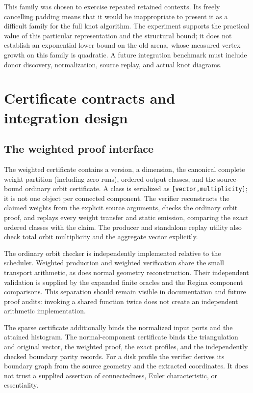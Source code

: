 \documentclass[11pt,a4paper]{article}
\theoremstyle{definition}
\theoremstyle{remark}
\newcommand{\code}[1]{\texttt{#1}}
\begin{document}
This family was chosen to exercise repeated retained contexts. Its freely
cancelling padding means that it would be inappropriate to present it as
a difficult family for the full knot algorithm. The experiment supports
the practical value of this particular representation and the structural
bound; it does not establish an exponential lower bound on the old arena,
whose measured vertex growth on this family is quadratic. A future
integration benchmark must include donor discovery, normalization, source
replay, and actual knot diagrams.

\FloatBarrier
\section{Certificate contracts and integration design}
\label{sec:contracts}

\subsection{The weighted proof interface}

The weighted certificate contains a version, a dimension, the canonical
complete weight partition (including zero runs), ordered output classes, and the
source-bound ordinary orbit certificate. A class is serialized as
\code{[vector,multiplicity]}; it is not one object per connected component.
The verifier reconstructs the claimed weights from the explicit source
arguments, checks the ordinary orbit proof, and replays every weight
transfer and static emission, comparing the exact ordered classes with the
claim. The producer and standalone replay utility also check total orbit
multiplicity and the aggregate vector explicitly.

The ordinary orbit checker is independently implemented relative to the
scheduler. Weighted production and weighted verification share the small
transport arithmetic, as does normal geometry reconstruction. Their
independent validation is supplied by the expanded finite oracles and
the Regina component comparisons. This separation should remain visible
in documentation and future proof audits: invoking a shared function twice
does not create an independent arithmetic implementation.

The sparse certificate additionally binds the normalized input ports and
the attained histogram. The normal-component certificate binds the
triangulation and original vector, the weighted proof, the exact profiles,
and the independently checked boundary parity records. For a disk profile
the verifier derives its boundary graph from the source geometry and
the extracted coordinates. It does not trust a supplied assertion of
connectedness, Euler characteristic, or essentiality.
\end{document}
